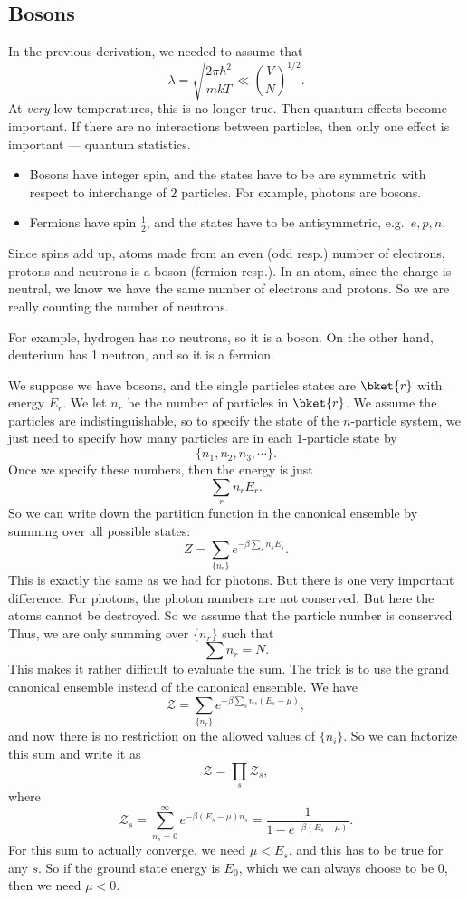 \documentclass[a4paper]{article}
\begin{document}
\subsection{Bosons}
In the previous derivation, we needed to assume that
\[
  \lambda = \sqrt{\frac{2\pi \hbar^2}{mkT}} \ll \left(\frac{V}{N}\right)^{1/2}.
\]
At \emph{very} low temperatures, this is no longer true. Then quantum effects become important. If there are no interactions between particles, then only one effect is important --- quantum statistics.
\begin{itemize}
  \item Bosons have integer spin, and the states have to be are symmetric with respect to interchange of $2$ particles. For example, photons are bosons.
  \item Fermions have spin $\frac{1}{2}$, and the states have to be antisymmetric, e.g.\ $e, p, n$.
\end{itemize}
Since spins add up, atoms made from an even (odd resp.) number of electrons, protons and neutrons is a boson (fermion resp.). In an atom, since the charge is neutral, we know we have the same number of electrons and protons. So we are really counting the number of neutrons.

For example, hydrogen has no neutrons, so it is a boson. On the other hand, deuterium has 1 neutron, and so it is a fermion.

We suppose we have bosons, and the single particles states are $\bket{r}$ with energy $E_r$. We let $n_r$ be the number of particles in $\bket{r}$. We assume the particles are indistinguishable, so to specify the state of the $n$-particle system, we just need to specify how many particles are in each $1$-particle state by
\[
  \{n_1, n_2, n_3, \cdots\}.
\]
Once we specify these numbers, then the energy is just
\[
  \sum_r n_r E_r.
\]
So we can write down the partition function in the canonical ensemble by summing over all possible states:
\[
  Z = \sum_{\{n_r\}} e^{-\beta \sum_s n_s E_s}.
\]
This is exactly the same as we had for photons. But there is one very important difference. For photons, the photon numbers are not conserved. But here the atoms cannot be destroyed. So we assume that the particle number is conserved. Thus, we are only summing over $\{n_r\}$ such that
\[
  \sum n_r = N.
\]
This makes it rather difficult to evaluate the sum. The trick is to use the grand canonical ensemble instead of the canonical ensemble. We have
\[
  \mathcal{Z} = \sum_{\{n_r\}} e^{-\beta \sum_s n_s (E_s - \mu)},
\]
and now there is no restriction on the allowed values of $\{n_i\}$. So we can factorize this sum and write it as
\[
  \mathcal{Z} = \prod_s \mathcal{Z}_s,
\]
where
\[
  \mathcal{Z}_s = \sum_{n_s = 0}^\infty e^{-\beta (E_s - \mu) n_s} = \frac{1}{1 - e^{-\beta(E_s - \mu)}}.
\]
For this sum to actually converge, we need $\mu < E_s$, and this has to be true for any $s$. So if the ground state energy is $E_0$, which we can always choose to be $0$, then we need $\mu < 0$.
\end{document}
